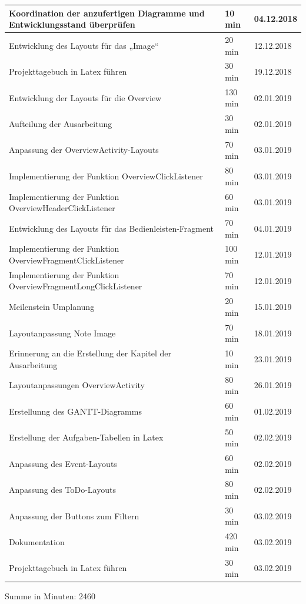 \begin{longtable}{|p{10cm}|p{2cm}|p{2cm}|}
Koordination der anzufertigen Diagramme und Entwicklungsstand überprüfen & 10 min & 04.12.2018 \\ \hline
Entwicklung des Layouts für das „Image“ & 20 min & 12.12.2018 \\ \hline
Projekttagebuch in Latex führen & 30 min & 19.12.2018 \\ \hline
Entwicklung der Layouts für die Overview & 130 min & 02.01.2019 \\ \hline
Aufteilung der Ausarbeitung & 30 min & 02.01.2019 \\ \hline
Anpassung der OverviewActivity-Layouts & 70 min & 03.01.2019 \\ \hline
Implementierung der Funktion OverviewClickListener & 80 min & 03.01.2019 \\ \hline
Implementierung der Funktion OverviewHeaderClickListener & 60 min & 03.01.2019 \\ \hline
Entwicklung des Layouts für das Bedienleisten-Fragment & 70 min & 04.01.2019 \\ \hline
Implementierung der Funktion OverviewFragmentClickListener & 100 min & 12.01.2019 \\ \hline
Implementierung der Funktion OverviewFragmentLongClickListener & 70 min & 12.01.2019 \\ \hline
Meilenstein Umplanung & 20 min & 15.01.2019 \\ \hline
Layoutanpassung Note Image & 70 min & 18.01.2019 \\ \hline
Erinnerung an die Erstellung der Kapitel der Ausarbeitung & 10 min & 23.01.2019 \\ \hline
Layoutanpassungen OverviewActivity & 80 min & 26.01.2019 \\ \hline
Erstellunng des GANTT-Diagramms & 60 min & 01.02.2019 \\ \hline
Erstellung der Aufgaben-Tabellen in Latex & 50 min & 02.02.2019\\ \hline
Anpassung des Event-Layouts & 60 min & 02.02.2019 \\ \hline
Anpassung des ToDo-Layouts & 80 min & 02.02.2019 \\ \hline
Anpassung der Buttons zum Filtern & 30 min & 03.02.2019 \\ \hline
Dokumentation & 420 min & 03.02.2019 \\ \hline
Projekttagebuch in Latex führen & 30 min & 03.02.2019 \\ \hline
\end{longtable}
Summe in Minuten: 2460

\newpage

